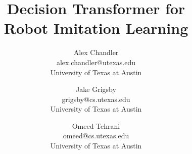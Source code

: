 \documentclass[conference]{IEEEtran}
\begin{document}
\title{Decision Transformer for \\Robot Imitation Learning}
\author{
    Alex Chandler \\ alex.chandler@utexas.edu \\ {University of Texas at Austin} 
   \and Jake Grigsby \\ grigsby@cs.utexas.edu \\ {University of Texas at Austin} 
   \and Omeed Tehrani \\ omeed@cs.utexas.edu \\ {University of Texas at Austin} 
}

\maketitle

\IEEEpeerreviewmaketitle


















\end{document}
